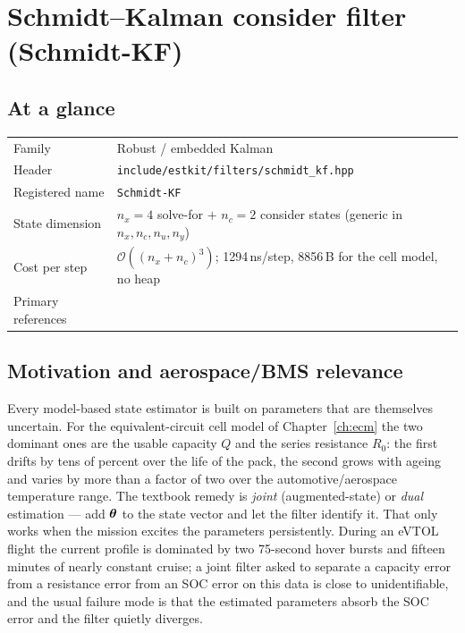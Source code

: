 \providecommand{\vf}{\bm{f}} \providecommand{\vh}{\bm{h}}
\providecommand{\vd}{\bm{d}} \providecommand{\mM}{\bm{M}}
\providecommand{\va}{\bm{a}} \providecommand{\vb}{\bm{b}}

\chapter{Schmidt--Kalman consider filter (Schmidt-KF)}
\label{ch:schmidtkf}

\section*{At a glance}
\begin{tabular}{@{}l>{\raggedright\arraybackslash}p{}@{}}
Family & Robust / embedded Kalman \\
Header & \texttt{include/estkit/filters/schmidt\_kf.hpp} \\
Registered name & \texttt{Schmidt-KF} \\
State dimension & $n_x = 4$ solve-for $+$ $n_c = 2$ consider states (generic in $n_x,n_c,n_u,n_y$) \\
Cost per step & $\mathcal{O}((n_x+n_c)^3)$; 1294\,ns/step, 8856\,B for the cell model, no heap \\
Primary references & \cite{schmidt1966,tapley2004,bucyjoseph1968,jazwinski1970} \\
\end{tabular}

\section{Motivation and aerospace/BMS relevance}
Every model-based state estimator is built on parameters that are themselves uncertain.  For the
equivalent-circuit cell model of Chapter~\ref{ch:ecm} the two dominant ones are the usable
capacity $Q$ and the series resistance $R_0$: the first drifts by tens of percent over the life of
the pack, the second grows with ageing and varies by more than a factor of two over the
automotive/aerospace temperature range.  The textbook remedy is \emph{joint} (augmented-state) or
\emph{dual} estimation --- add $\bm{\theta}$ to the state vector and let the filter identify it.  That
only works when the mission excites the parameters persistently.  During an eVTOL flight the
current profile is dominated by two 75-second hover bursts and fifteen minutes of nearly constant
cruise; a joint filter asked to separate a capacity error from a resistance error from an SOC
error on this data is close to unidentifiable, and the usual failure mode is that the estimated
parameters absorb the SOC error and the filter quietly diverges.

